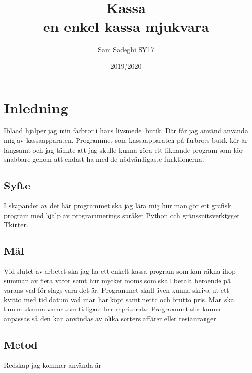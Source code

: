 \documentclass[a4paper, 12pt]{article}
\title{Kassa\\\large en enkel kassa mjukvara}
\author{Sam Sadeghi SY17}
\date{2019/2020}
\begin{document}
\begin{titlepage}
\maketitle
\end{titlepage}


\begin{abstract}

\end{abstract}
\newpage
\tableofcontents
\newpage

\section{Inledning}
Ibland hjälper jag min farbror i hans livsmedel butik. 
Där får jag använd använda mig av kassaapparaten. 
Programmet som kassaapparaten på farbrors butik kör är långsamt och jag tänkte att jag skulle kunna göra ett liknande program som kör snabbare genom att endast ha med de nödvändigaste funktionerna.

\subsection{Syfte}

I skapandet av det här programmet ska jag lära mig hur man gör ett grafisk program med hjälp av programmerings språket Python och gränssnitsverktyget Tkinter. 

\subsection{Mål}

Vid slutet av arbetet ska jag ha ett enkelt kassa program som kan räkna ihop summan av flera varor samt hur mycket moms som skall betala beroende på varans vad för slags vara det är.
 Programmet skall även kunna skriva ut ett kvitto med tid datum vad man har köpt samt netto och brutto pris.
 Man ska kunna skanna varor som tidigare har repriserats.
 Programmet ska kunna anpassas så den kan användas av olika sorters affärer eller restauranger.

\subsection{Metod}

Redskap jag kommer använda är
\end{document}
